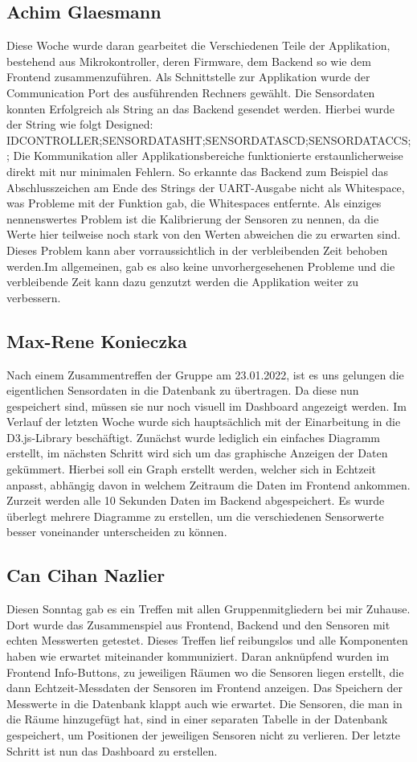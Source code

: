 \documentclass[]{article}
\begin{document}
\subsection{Achim Glaesmann}
Diese Woche wurde daran gearbeitet die Verschiedenen Teile der Applikation, bestehend aus Mikrokontroller, deren Firmware, dem Backend so wie dem Frontend zusammenzuführen. Als Schnittstelle zur Applikation wurde der Communication Port des ausführenden Rechners gewählt. Die Sensordaten konnten Erfolgreich als String an das Backend gesendet werden. Hierbei wurde der String wie folgt Designed: IDCONTROLLER;SENSORDATASHT;SENSORDATASCD;SENSORDATACCS;;
Die Kommunikation aller Applikationsbereiche funktionierte erstaunlicherweise direkt mit nur minimalen Fehlern. So erkannte das Backend zum Beispiel das Abschlusszeichen am Ende des Strings der UART-Ausgabe nicht als Whitespace, was Probleme mit der Funktion gab, die Whitespaces entfernte.
 Als einziges nennenswertes Problem ist die Kalibrierung der Sensoren zu nennen, da die Werte hier teilweise noch stark von den Werten abweichen die zu erwarten sind. Dieses Problem kann aber vorraussichtlich in der verbleibenden Zeit behoben werden.Im allgemeinen, gab es also keine unvorhergesehenen Probleme und die verbleibende Zeit kann dazu genzutzt werden die Applikation weiter zu verbessern.


\subsection{Max-Rene Konieczka}
Nach einem Zusammentreffen der Gruppe am 23.01.2022, ist es uns gelungen die eigentlichen Sensordaten in die Datenbank zu übertragen. Da diese nun gespeichert sind, müssen sie nur noch visuell im Dashboard angezeigt werden. Im Verlauf der letzten Woche wurde sich hauptsächlich mit der Einarbeitung in die D3.js-Library beschäftigt. Zunächst wurde lediglich ein einfaches Diagramm erstellt, im nächsten Schritt wird sich um das graphische Anzeigen der Daten gekümmert. Hierbei soll ein Graph erstellt werden, welcher sich in Echtzeit anpasst, abhängig davon in welchem Zeitraum die Daten im Frontend ankommen. Zurzeit werden alle 10 Sekunden Daten im Backend abgespeichert. Es wurde überlegt mehrere Diagramme zu erstellen, um die verschiedenen Sensorwerte besser voneinander unterscheiden zu können.  

\subsection{Can Cihan Nazlier}
Diesen Sonntag gab es ein Treffen mit allen Gruppenmitgliedern bei mir Zuhause. Dort wurde das Zusammenspiel aus Frontend, Backend und den Sensoren mit echten Messwerten getestet. Dieses Treffen lief reibungslos und alle Komponenten haben wie erwartet miteinander kommuniziert. Daran anknüpfend wurden im Frontend Info-Buttons, zu jeweiligen Räumen wo die Sensoren liegen erstellt, die dann Echtzeit-Messdaten der Sensoren im Frontend anzeigen. Das Speichern der Messwerte in die Datenbank klappt auch wie erwartet.
Die Sensoren, die man in die Räume hinzugefügt hat, sind in einer separaten Tabelle in der Datenbank gespeichert, um Positionen der jeweiligen Sensoren nicht zu verlieren.
Der letzte Schritt ist nun das Dashboard zu erstellen.

\printbibliography
\end{document}
